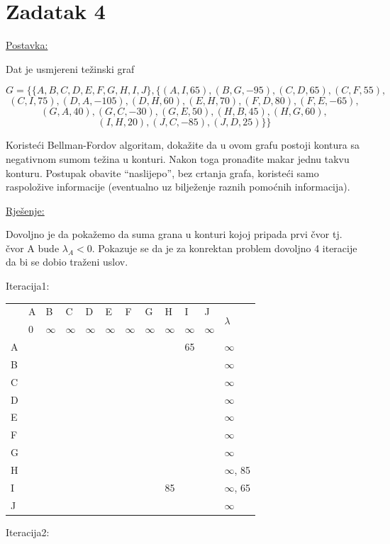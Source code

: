 \documentclass[12pt]{article}
\begin{document}
\newpage

\section*{Zadatak 4\label{Z4}}
\underline{Postavka:}

Dat je usmjereni težinski graf

$$G = \{\{A, B, C, D, E, F, G, H, I, J\}, \{(A, I, 65), (B, G, -95), (C, D, 65), (C, F, 55),$$
 $$(C, I, 75), (D, A, -105), (D, H, 60), (E, H, 70), (F, D, 80), (F, E, -65), $$
$$(G, A, 40), (G, C, -30), (G, E, 50), (H, B, 45), (H, G, 60),$$
$$(I, H, 20), (J, C, -85), (J, D, 25)\}\}$$

Koristeći Bellman-Fordov algoritam, dokažite da u ovom grafu postoji kontura sa negativnom sumom težina u konturi. Nakon toga pronađite makar jednu takvu konturu. Postupak obavite “naslijepo”, bez crtanja grafa, koristeći samo raspoložive informacije (eventualno uz bilježenje raznih pomoćnih informacija).


\underline{Rješenje:}

Dovoljno je da pokažemo da suma grana u konturi kojoj pripada prvi čvor tj. čvor A bude $\lambda_A < 0$.
Pokazuje se da je za konrektan problem dovoljno 4 iteracije da bi se dobio traženi uslov.

Iteracija1:

\begin{table}[hp]
\centering
\begin{tabular}{|l|l|l|l|l|l|l|l|l|l|l|l|}
\hline
\multirow{2}{*}{} & A & B & C & D & E & F & G & H & I & J & \multirow{2}{*}{$\lambda$} \\ \cline{2-11}
 & 0 & $\infty$ & $\infty$ & $\infty$ & $\infty$ & $\infty$ & $\infty$ & $\infty$ & $\infty$ & $\infty$ &  \\ \hline
A &  &  &  &  &  &  &  &  & 65 &  & $\infty$ \\ \hline
B &  &  &  &  &  &  &  &  &  &  & $\infty$ \\ \hline
C &  &  &  &  &  &  &  &  &  &  & $\infty$ \\ \hline
D &  &  &  &  &  &  &  &  &  &  & $\infty$ \\ \hline
E &  &  &  &  &  &  &  &  &  &  & $\infty$ \\ \hline
F &  &  &  &  &  &  &  &  &  &  & $\infty$ \\ \hline
G &  &  &  &  &  &  &  &  &  &  & $\infty$ \\ \hline
H &  &  &  &  &  &  &  &  &  &  & $\infty$, 85 \\ \hline
I &  &  &  &  &  &  &  & 85 &  &  & $\infty$, 65 \\ \hline
J &  &  &  &  &  &  &  &  &  &  & $\infty$ \\ \hline
\end{tabular}
\end{table}
\newpage
Iteracija2:
\end{document}

